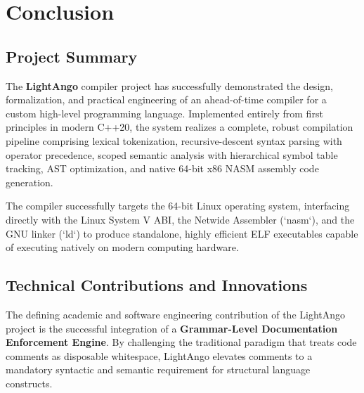 \chapter{Conclusion}\doublespacing

\section{Project Summary}
The \textbf{LightAngo} compiler project has successfully demonstrated the design, formalization, and practical engineering of an ahead-of-time compiler for a custom high-level programming language. Implemented entirely from first principles in modern C++20, the system realizes a complete, robust compilation pipeline comprising lexical tokenization, recursive-descent syntax parsing with operator precedence, scoped semantic analysis with hierarchical symbol table tracking, AST optimization, and native 64-bit x86 NASM assembly code generation.

The compiler successfully targets the 64-bit Linux operating system, interfacing directly with the Linux System V ABI, the Netwide Assembler (`nasm`), and the GNU linker (`ld`) to produce standalone, highly efficient ELF executables capable of executing natively on modern computing hardware.

\section{Technical Contributions and Innovations}
The defining academic and software engineering contribution of the LightAngo project is the successful integration of a \textbf{Grammar-Level Documentation Enforcement Engine}. By challenging the traditional paradigm that treats code comments as disposable whitespace, LightAngo elevates comments to a mandatory syntactic and semantic requirement for structural language constructs.

